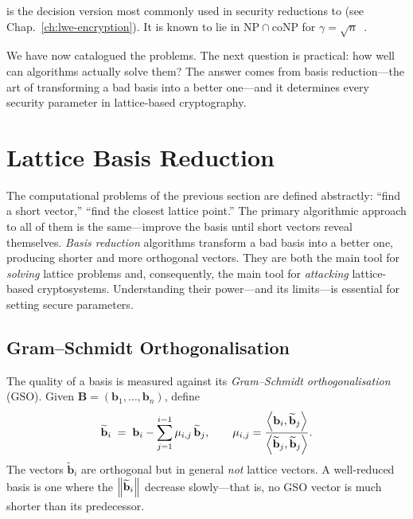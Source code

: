 \gapsvp{} is the decision version most commonly used in security reductions to \lwe{} (see Chap.~\ref{ch:lwe-encryption}).  It is known to lie in $\mathrm{NP}\cap\mathrm{coNP}$ for $\gamma = \sqrt{n}$~\cite{Ajtai1996, MicciancioGoldwasser2002}.

We have now catalogued the problems.  The next question is practical: how well can algorithms actually solve them?  The answer comes from basis reduction---the art of transforming a bad basis into a better one---and it determines every security parameter in lattice-based cryptography.


\section{Lattice Basis Reduction}
\label{sec:basis-reduction}

The computational problems of the previous section are defined abstractly: ``find a short vector,'' ``find the closest lattice point.''  The primary algorithmic approach to all of them is the same---improve the basis until short vectors reveal themselves.  \emph{Basis reduction} algorithms transform a bad basis into a better one, producing shorter and more orthogonal vectors.  They are both the main tool for \emph{solving} lattice problems and, consequently, the main tool for \emph{attacking} lattice-based cryptosystems.  Understanding their power---and its limits---is essential for setting secure parameters.

\subsection{Gram--Schmidt Orthogonalisation}
\label{subsec:gram-schmidt}

The quality of a basis is measured against its \emph{Gram--Schmidt orthogonalisation} (GSO).  Given $\mathbf{B} = (\mathbf{b}_1,\ldots,\mathbf{b}_n)$, define
\begin{equation}
\widetilde{\mathbf{b}}_i \;=\; \mathbf{b}_i - \sum_{j=1}^{i-1} \mu_{i,j}\,\widetilde{\mathbf{b}}_j, \qquad \mu_{i,j} = \frac{\left\langle \mathbf{b}_i, \widetilde{\mathbf{b}}_j \right\rangle}{\left\langle \widetilde{\mathbf{b}}_j, \widetilde{\mathbf{b}}_j \right\rangle}.
\end{equation}
The vectors $\widetilde{\mathbf{b}}_i$ are orthogonal but in general \emph{not} lattice vectors.  A well-reduced basis is one where the $\left\lVert \widetilde{\mathbf{b}}_i \right\rVert$ decrease slowly---that is, no GSO vector is much shorter than its predecessor.


